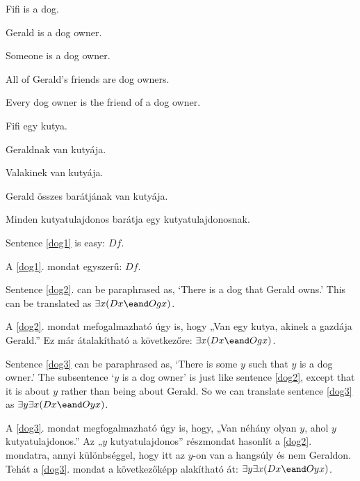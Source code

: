 \begin{earg}
\item[\ex{dog1}] Fifi is a dog.
\item[\ex{dog2}] Gerald is a dog owner.
\item[\ex{dog3}] Someone is a dog owner.
\item[\ex{dog4}] All of Gerald's friends are dog owners.
\item[\ex{dog5}] Every dog owner is the friend of a dog owner.
\end{earg}

\begin{earg}
\item[\ex{dog1}] Fifi egy kutya.
\item[\ex{dog2}] Geraldnak van kutyája.
\item[\ex{dog3}] Valakinek van kutyája.
\item[\ex{dog4}] Gerald összes barátjának van kutyája.
\item[\ex{dog5}] Minden kutyatulajdonos barátja egy kutyatulajdonosnak.
\end{earg}

Sentence \ref{dog1} is easy: $Df$.

A \ref{dog1}. mondat egyszerű: $Df$.

Sentence \ref{dog2}. can be paraphrased as, `There is a dog that Gerald owns.' This can be translated as $\exists x(Dx \eand Ogx)$.

A \ref{dog2}. mondat mefogalmazható úgy is, hogy „Van egy kutya, akinek a gazdája Gerald.” Ez már átalakítható a következőre: $\exists x(Dx \eand Ogx)$.

Sentence \ref{dog3} can be paraphrased as, `There is some $y$ such that $y$ is a dog owner.' The subsentence `$y$ is a dog owner' is just like sentence \ref{dog2}, except that it is about $y$ rather than being about Gerald. So we can translate sentence \ref{dog3} as $\exists y \exists x(Dx \eand Oyx)$. 

A \ref{dog3}. mondat megfogalmazható úgy is, hogy, „Van néhány olyan $y$, ahol $y$ kutyatulajdonos.” Az „$y$ kutyatulajdonos” részmondat hasonlít a \ref{dog2}. mondatra, annyi különbséggel, hogy itt az $y$-on van a hangsúly és nem Geraldon. Tehát a \ref{dog3}. mondat a következőképp alakítható át: $\exists y \exists x(Dx \eand Oyx)$. 

